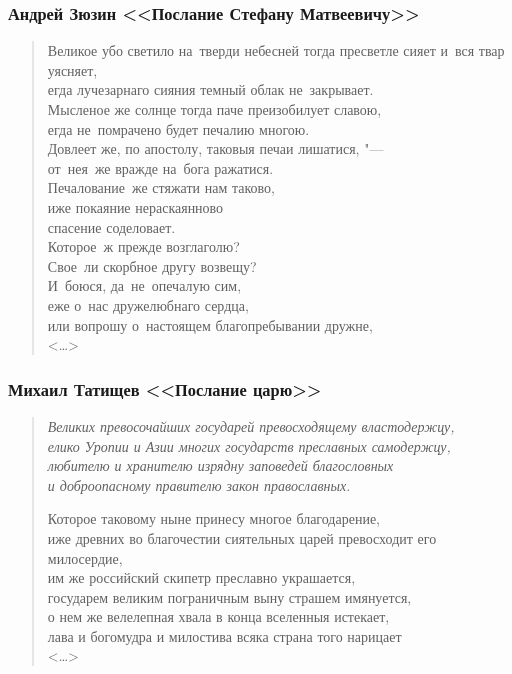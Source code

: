 \documentclass{beamer}
\begin{document}

\begin{frame}
\frametitle{Андрей Зюзин <<Послание Стефану Матвеевичу>>}

\begin{verse}
Великое убо светило на~тверди небесней тогда пресветле сияет и~вся твар уясняет,\\
егда лучезарнаго сияния темный облак не~закрывает.\\
Мысленое же солнце тогда паче преизобилует славою,\\
егда не~помрачено будет печалию многою.\\
Довлеет же, по апостолу, таковыя печаи лишатися, "---\\
от~нея~же вражде на~бога ражатися.\\
Печалование~же стяжати нам таково,\\
иже покаяние нераскаянново\\
спасение соделовает.\\
Которое~ж прежде возглаголю?\\
Свое~ли скорбное другу возвещу?\\
И~боюся, да~не~опечалую сим,\\
еже о~нас дружелюбнаго сердца,\\
или вопрошу о~настоящем благопребывании дружне,\\
<\dots>
\end{verse}

\end{frame}


\begin{frame}
\frametitle{Михаил Татищев <<Послание царю>>}

\begin{verse}
\textit{Великих превосочайших государей превосходящему властодержцу,\\
елико Уропии и Азии многих государств преславных самодержцу,\\
любителю и хранителю изрядну заповедей благословных\\
и доброопасному правителю закон православных.}

Которое таковому ныне принесу многое благодарение,\\
иже древних во благочестии сиятельных царей превосходит его милосердие,\\
им же российский скипетр преславно украшается,\\
государем великим пограничным выну страшем имянуется,\\
о нем же велелепная хвала в конца вселенныя истекает,\\
лава и богомудра и милостива всяка страна того нарицает\\
<\dots>
\end{verse}

\end{frame}
\end{document}
